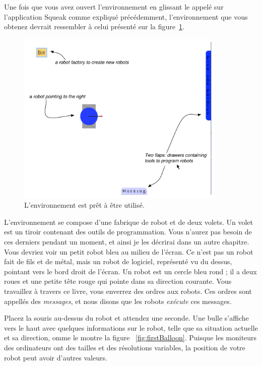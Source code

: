 \documentclass[a4paper,10pt,twoside]{book}
\begin{document}
Une fois que vous avez ouvert l'environnement en glissant le appel\'e  sur l'application Squeak comme expliqu\'e pr\'ec\'edemment, l'environnement que vous obtenez devrait ressembler \`a celui pr\'esent\'e sur la figure~\ref{fig:firstEnvironment}.

\begin{figure}[!h]\centerline{\includegraphics[width=10cm]{7-firstEnvironmentAnnotated}} 
\caption{L'environnement est pr\^et \`a \^etre utilis\'e.\label{fig:firstEnvironment}}
\end{figure}

L'environnement se compose d'une fabrique de robot et de deux volets. Un volet est un tiroir contenant des outils de programmation. Vous n'aurez pas besoin de ces derniers pendant un moment, et ainsi je les d\'ecrirai dans un autre chapitre. Vous devriez voir un petit robot bleu au milieu de l'\'ecran. Ce n'est pas un robot fait de fils et de m\'etal, mais un robot de logiciel, repr\'esent\'e vu du dessus, pointant vers le bord droit de l'\'ecran. Un robot est un cercle bleu rond ; il a deux roues et une petite t\^ete rouge qui pointe dans sa direction courante. Vous travaillez \`a travers ce livre, vous enverrez des ordres aux robots. Ces ordres sont appell\'es des \emph{messages}, et nous disons que les robots \emph{ex\'ecute} ces messages.

Placez la souris au-dessus du robot et attendez une seconde. Une bulle s'affiche vers le haut avec quelques informations sur le robot, telle que sa situation actuelle et sa direction, omme le montre la figure ~\ref{fig:firstBalloon}.
Puisque les moniteurs des ordinateurs ont des tailles et des r\'esolutions variables, la position de votre robot peut avoir d'autres valeurs.
\end{document}
